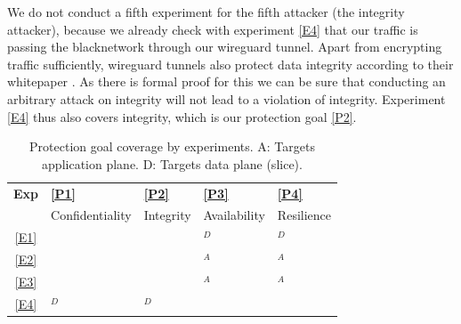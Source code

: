 \begin{description}[style=multiline, labelwidth=0.7cm]



\end{description}

We do not conduct a fifth experiment for the fifth attacker (the integrity attacker), because we already check with experiment \ref{E4} that our traffic is passing the \gls{blacknetwork} through our \gls{wireguard} tunnel. Apart from encrypting traffic sufficiently, \gls{wireguard} tunnels also protect data integrity according to their whitepaper \cite{wireguard}. As there is formal proof for this we can be sure that conducting an arbitrary attack on integrity will not lead to a violation of integrity. Experiment \ref{E4} thus also covers integrity, which is our protection goal \ref{P2}.

\begin{table}[ht]
    \centering
    \begin{tabular}{|c|P|P|P|P|}
        \hline
        \textbf{Exp} & \textbf{\ref{P1}} & \textbf{\ref{P2}} & \textbf{\ref{P3}} & \textbf{\ref{P4}} \\
        ~            & Confidentiality   & Integrity         & Availability      & Resilience        \\
        \hline
        \ref{E1}     & ~                 & ~                 & $^D$     & $^D$     \\
        \ref{E2}     & ~                 & ~                 & $^A$     & $^A$     \\
        \ref{E3}     & ~                 & ~                 & $^A$     & $^A$     \\
        \ref{E4}     & $^D$     & $^D$     & ~                 & ~                 \\
        \hline
    \end{tabular}
    \caption[Protection goal coverage by experiments]{Protection goal coverage by experiments. A: Targets application plane. D: Targets data plane (slice).}
    \label{table:experiment_coverage}
\end{table}

